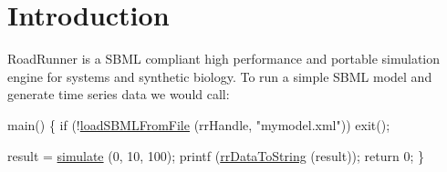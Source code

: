 \hypertarget{index_intro_sec}{}\section{Introduction}\label{index_intro_sec}
Road\-Runner is a S\-B\-M\-L compliant high performance and portable simulation engine for systems and synthetic biology. To run a simple S\-B\-M\-L model and generate time series data we would call\-:


\begin{DoxyCode}
main()
\{
   \textcolor{keywordflow}{if} (!\hyperlink{group__loadsave_ga03cb924c6790b039f77a1a9c5dbcdda1}{loadSBMLFromFile} (rrHandle, \textcolor{stringliteral}{"mymodel.xml"}))
       exit();

   result = \hyperlink{group__simulation_gabbfb1f6f19c777c59fccf8c453c874f7}{simulate} (0, 10, 100);
   printf (\hyperlink{group__to_string_ga41cff9a733e2531a57bc07b12ae4efe0}{rrDataToString} (result));
   \textcolor{keywordflow}{return} 0;
\}
\end{DoxyCode}


